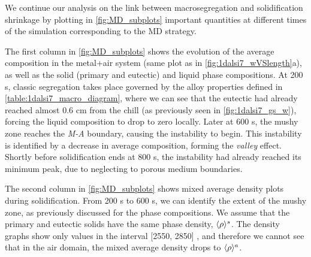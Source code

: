 We continue our analysis on the link between macrosegregation and solidification shrinkage by plotting in \cref{fig:MD_subplots} important 
quantities at different times of the simulation corresponding to the MD strategy.

The first column in \cref{fig:MD_subplots} shows the evolution of the average composition in the metal+air system 
(same plot as in \cref{fig:1dalsi7_wVSlength}a), as well as the solid (primary and eutectic) and liquid phase compositions. 
At 200 s, classic segregation takes place governed by the alloy properties defined in \cref{table:1dalsi7_macro_diagram},
where we can see that the eutectic had already reached almost 0.6 cm from the chill (as previously seen in \cref{fig:1dalsi7_gs_w}), 
forcing the liquid composition to drop to zero locally.
Later at 600 s, the mushy zone reaches the \emph{M-A} boundary, causing the instability to begin. This instability is identified by
a decrease in average composition, forming the \emph{valley} effect. Shortly before solidification ends at 800 s, the instability had
already reached its minimum peak, due to neglecting to porous medium boundaries. 

The second column in \cref{fig:MD_subplots} shows mixed average density plots during solidification. From 200 s to 600 s, we can identify
the extent of the mushy zone, as previously discussed for the phase compositions. We assume that the primary and eutectic solids have the same phase density, $\langle \rho \rangle^s$.
The density graphs show only values in the interval [2550, 2850] \si{\udensity}, and therefore we cannot see that in the air domain, the mixed average density
drops to $\langle \rho \rangle^a$. 

